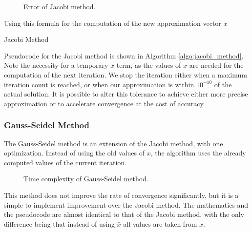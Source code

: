 \documentclass[../fem.tex]{subfile}
\begin{document}
\begin{figure}[htpb]
  \centering
  
  \caption{Error of Jacobi method.}
  \label{fig:j_err}
\end{figure}

Using this formula for the computation of the new approximation vector $x$

\begin{algorithm}[H]
  \caption{Jacobi Method}\label{algo:jacobi_method}
  \begin{algorithmic}
    \EndFor
    \EndFor
    \EndIf
    \EndFor
  \end{algorithmic}
\end{algorithm}

Pseudocode for the Jacobi method is shown in Algorithm \ref{algo:jacobi_method}.
Note the necessity for a temporary $\bar{x}$ term, as the values of $x$ are
needed for the computation of the next iteration. We stop the iteration either
when a maximum iteration count is reached, or when our approximation is within
$10^{-10}$ of the actual solution. It is possible to alter this tolerance to
achieve either more precise approximation or to accelerate convergence at the
cost of accuracy.


\subsubsection{Gauss-Seidel Method}%
\label{ssub:gauss_seidel_method}

The Gauss-Seidel method is an extension of the Jacobi method, with one
optimization. Instead of using the old values of $x$, the algorithm uses the
already computed values of the current iteration.

\begin{figure}[htpb]
  \centering
  
  \caption{Time complexity of Gauss-Seidel method.}
  \label{fig:gs_time}
\end{figure}

This method does not improve the rate of convergence significantly, but it is a
simple to implement improvement over the Jacobi method. The mathematics and the
pseudocode are almost identical to that of the Jacobi method, with the only
difference being that instead of using $\bar{x}$ all values are taken from $x$.
\end{document}
